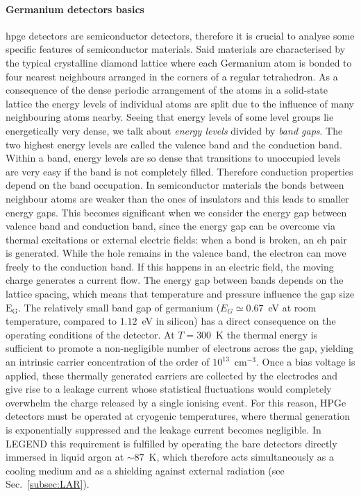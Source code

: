 \paragraph{Germanium detectors basics}
\label{par:Ge-detector-basics}
\ac{hpge} detectors are semiconductor detectors, therefore it is crucial to analyse some specific features of semiconductor materials.
 Said materials are characterised by the typical crystalline diamond lattice where each Germanium atom is bonded to four nearest neighbours arranged in the corners of a regular tetrahedron. As a consequence of the dense periodic arrangement of the atoms in a solid-state lattice the energy levels of individual atoms are split due to the influence of many neighbouring atoms nearby. Seeing that energy levels of some level groups lie energetically very dense, we talk about \textit{energy levels} divided by \textit{band gaps}. 
The two highest energy levels are called the valence band and the conduction band. Within a band, energy levels are so dense that transitions to unoccupied levels are very easy if the band is not completely filled. Therefore conduction properties depend on the band occupation. In semiconductor materials the bonds between neighbour atoms are weaker than the ones of insulators and this leads to smaller energy gaps. This becomes significant when we consider the energy gap between valence band and conduction band, since the energy gap can be overcome via thermal excitations or external electric fields: when a bond is broken, an \ac{eh} pair is generated. While the hole remains in the valence band, the electron can move freely to the conduction band. If this happens in an electric field, the moving charge generates a current flow. The energy gap between bands depends on the lattice spacing, which means that temperature and pressure influence the gap size $\text{E}_\text{G}$.
The relatively small band gap of germanium ($E_G \simeq 0.67$~eV at room temperature, compared to $1.12$~eV in silicon) has a direct consequence on the operating conditions of the detector. At $T = 300$~K the thermal energy is sufficient to promote a non-negligible number of electrons across the gap, yielding an intrinsic carrier concentration of the order of $10^{13}$~cm$^{-3}$. Once a bias voltage is applied, these thermally generated carriers are collected by the electrodes and give rise to a leakage current whose statistical fluctuations would completely overwhelm the charge released by a single ionising event. For this reason, HPGe detectors must be operated at cryogenic temperatures, where thermal generation is exponentially suppressed and the leakage current becomes negligible. In LEGEND this requirement is fulfilled by operating the bare detectors directly immersed in liquid argon at $\sim 87$~K, which therefore acts simultaneously as a cooling medium and as a shielding against external radiation (see Sec.~\ref{subsec:LAR}).

